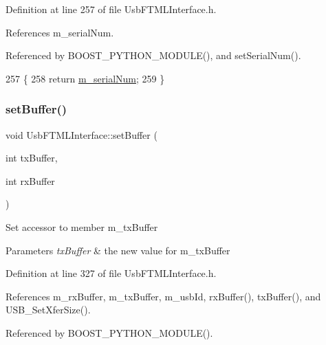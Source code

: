 Definition at line 257 of file Usb\+F\+T\+M\+L\+Interface.\+h.



References m\+\_\+serial\+Num.



Referenced by B\+O\+O\+S\+T\+\_\+\+P\+Y\+T\+H\+O\+N\+\_\+\+M\+O\+D\+U\+L\+E(), and set\+Serial\+Num().


\begin{DoxyCode}
257                          \{
258     \textcolor{keywordflow}{return} \hyperlink{classUsbFTMLInterface_a389d847226de3203f7331ab8509c442c}{m\_serialNum};
259   \}
\end{DoxyCode}
\mbox{\label{classUsbFTMLInterface_a0223b6508fe1ac8da3aee952da113b1a}} 
\subsubsection{\texorpdfstring{set\+Buffer()}{setBuffer()}}
{\footnotesize\ttfamily void Usb\+F\+T\+M\+L\+Interface\+::set\+Buffer (\begin{DoxyParamCaption}\item[{int}]{tx\+Buffer,  }\item[{int}]{rx\+Buffer }\end{DoxyParamCaption})\hspace{0.3cm}{\ttfamily [inline]}}

Set accessor to member m\+\_\+tx\+Buffer 
\begin{DoxyParams}{Parameters}
{\em tx\+Buffer} & the new value for m\+\_\+tx\+Buffer \\
\hline
\end{DoxyParams}


Definition at line 327 of file Usb\+F\+T\+M\+L\+Interface.\+h.



References m\+\_\+rx\+Buffer, m\+\_\+tx\+Buffer, m\+\_\+usb\+Id, rx\+Buffer(), tx\+Buffer(), and U\+S\+B\+\_\+\+Set\+Xfer\+Size().



Referenced by B\+O\+O\+S\+T\+\_\+\+P\+Y\+T\+H\+O\+N\+\_\+\+M\+O\+D\+U\+L\+E().


